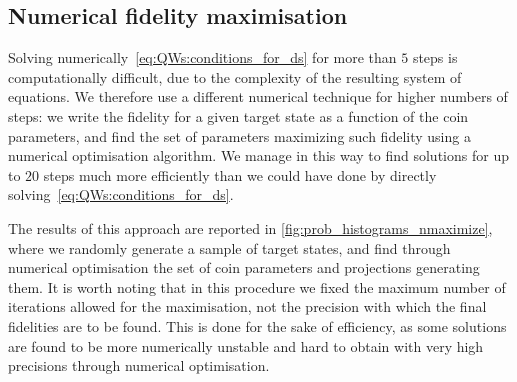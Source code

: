 \FloatBarrier
\subsection{Numerical fidelity maximisation}
\label{sec:QWs:numerical_fid_max}

Solving numerically~\cref{eq:QWs:conditions_for_ds} for more than $5$ steps is computationally difficult, due to the complexity of the resulting system of equations.
We therefore use a different numerical technique for higher numbers of steps:
we write the fidelity for a given target state as a function of the coin parameters, and find the set of parameters maximizing such fidelity using a numerical optimisation algorithm.
We manage in this way to find solutions for up to $20$ steps much more efficiently than we could have done by directly solving~\cref{eq:QWs:conditions_for_ds}.

The results of this approach are reported in \cref{fig:prob_histograms_nmaximize}, where we randomly generate a sample of target states, and find through numerical optimisation the set of coin parameters and projections generating them.
It is worth noting that in this procedure we fixed the maximum number of iterations allowed for the maximisation, not the precision with which the final fidelities are to be found.
This is done for the sake of efficiency, as some solutions are found to be more numerically unstable and hard to obtain with very high precisions through numerical optimisation.

